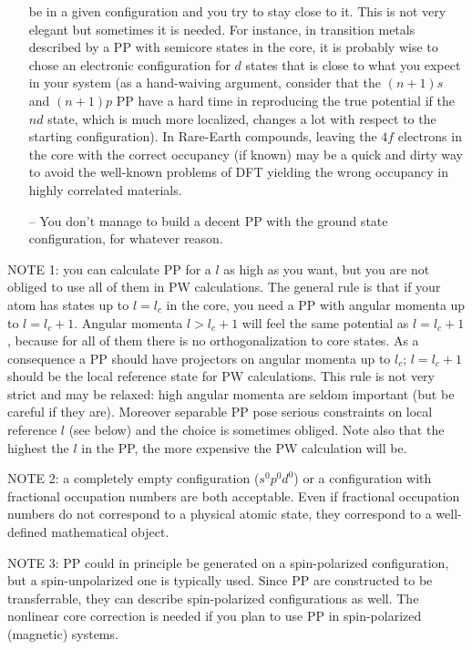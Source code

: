 \documentclass[12pt]{article}
\begin{document}
\begin{enumerate}
   be in a given configuration and you try to stay close to it.
   This is not very elegant but sometimes it is needed. For instance,
   in transition metals described by a PP with semicore states in the 
   core, it is probably wise to chose an electronic configuration for 
   $d$ states that is close to what you expect in your system (as a
   hand-waiving argument, consider that the $(n+1)s$ and $(n+1)p$ PP 
   have a hard time in reproducing the true potential if the $nd$ state,
   which is much more localized, changes a lot with respect to the
   starting configuration). In Rare-Earth compounds, leaving the $4f$ 
   electrons in the core with the correct occupancy (if known) may be 
   a quick and dirty way to avoid the well-known problems of DFT yielding 
   the wrong occupancy in highly correlated materials.
\item[--]
   You don't manage to build a decent PP with the ground state configuration, 
   for whatever reason.
\end{enumerate}

NOTE 1: you can calculate PP for a $l$ as high as you want, but you
are not obliged to use all of them in PW calculations. The general
rule is that if your atom has states up to $l=l_c$ in the core, you
need a PP with angular momenta up to $l=l_c+1$. Angular momenta
$l>l_c+1$ will feel the same potential as $l=l_c+1$, because
for all of them there is no orthogonalization to core states.
As a consequence a PP should have projectors on angular momenta up to
$l_c$; $l=l_c+1$ should be the local reference state for PW
calculations. This rule is not very strict and may be relaxed: high
angular momenta are seldom important (but be careful if they are). 
Moreover separable PP pose serious constraints on local reference $l$
(see below) and the choice is sometimes obliged. Note also that the
highest the $l$ in the PP, the more expensive the PW calculation will 
be.

NOTE 2: a completely empty configuration ($s^0p^0d^0$) or
a configuration with fractional occupation numbers are both
acceptable. Even if fractional occupation numbers do
not correspond to a physical atomic state, they correspond to a
well-defined mathematical object.

NOTE 3: PP could in principle be generated on a spin-polarized
configuration, but a spin-unpolarized one is typically used.
Since PP are constructed to be transferrable, they can describe
spin-polarized configurations as well. The nonlinear core correction
is needed if you plan to use PP in spin-polarized (magnetic)
systems.
\end{document}
